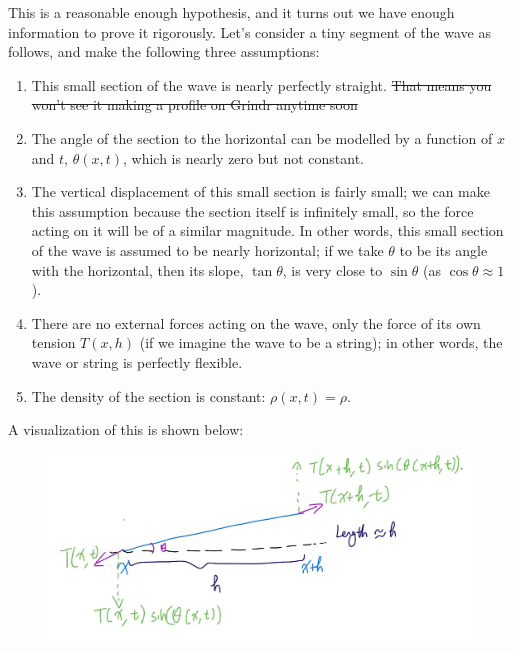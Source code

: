 \documentclass{article}
\begin{document}
This is a reasonable enough hypothesis, and it turns out we have enough information to prove it rigorously. Let's consider a tiny segment of the wave as follows, and make the following three assumptions:
\begin{enumerate}
    \item This small section of the wave is nearly perfectly straight. \sout{That means you won't see it making a profile on Grindr anytime soon}
    \item The angle of the section to the horizontal can be modelled by a function of $x$ and $t$, $\theta(x,t)$, which is nearly zero but not constant.
    \item The vertical displacement of this small section is fairly small; we can make this assumption because the section itself is infinitely small, so the force acting on it will be of a similar magnitude. In other words, this small section of the wave is assumed to be nearly horizontal; if we take $\theta$ to be its angle with the horizontal, then its slope, $\tan \theta$, is very close to $\sin \theta$ (as $\cos \theta \approx 1$). 
    \item There are no external forces acting on the wave, only the force of its own tension $T(x,h)$ (if we imagine the wave to be a string); in other words, the wave or string is perfectly flexible.
    \item The density of the section is constant: $\rho(x,t)=\rho$.
\end{enumerate}
A visualization of this is shown below:
\newpage
\begin{figure}[h]
    \centering
    \includegraphics[width=12cm]{DE-ch4-wave3.jpg}
\end{figure}
\end{document}
